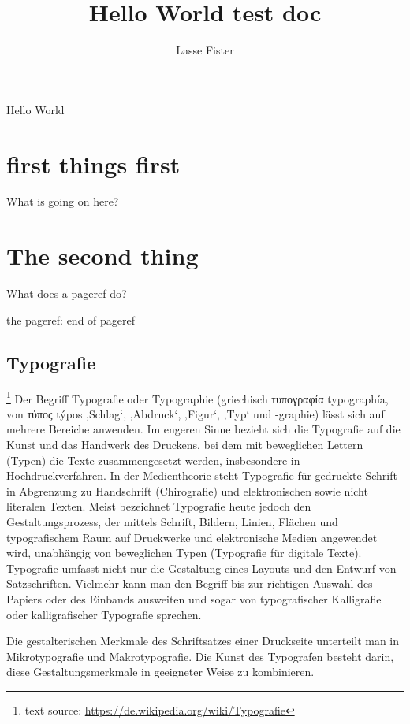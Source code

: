 \documentclass[a4paper]{article}
\title{Hello World test doc}
\author{Lasse Fister}
\begin{document}
\pagecolor{pagecolor}
\color{textcolor}

\maketitle
\tableofcontents
\newpage


Hello World

\section{first things first}

What is going on here?


\section{The second thing}
What does a pageref do?

the pageref: \pageref{ref:my-ref} end of pageref




\subsection{Typografie} \footnote{text source: \url{https://de.wikipedia.org/wiki/Typografie}}
\label{ref:my-ref}
Der Begriff Typografie oder Typographie (griechisch τυπογραφία typographía, von τύπος týpos ‚Schlag‘, ‚Abdruck‘, ‚Figur‘, ‚Typ‘ und -graphie) lässt sich auf mehrere Bereiche anwenden. Im engeren Sinne bezieht sich die Typografie auf die Kunst und das Handwerk des Druckens, bei dem mit beweglichen Lettern (Typen) die Texte zusammengesetzt werden, insbesondere in Hochdruckverfahren. In der Medientheorie steht Typografie für gedruckte Schrift in Abgrenzung zu Handschrift (Chirografie) und elektronischen sowie nicht literalen Texten. Meist bezeichnet Typografie heute jedoch den Gestaltungsprozess, der mittels Schrift, Bildern, Linien, Flächen und typografischem Raum auf Druckwerke und elektronische Medien angewendet wird, unabhängig von beweglichen Typen (Typografie für digitale Texte). Typografie umfasst nicht nur die Gestaltung eines Layouts und den Entwurf von Satzschriften. Vielmehr kann man den Begriff bis zur richtigen Auswahl des Papiers oder des Einbands ausweiten und sogar von typografischer Kalligrafie oder kalligrafischer Typografie sprechen.

Die gestalterischen Merkmale des Schriftsatzes einer Druckseite unterteilt man in Mikrotypografie und Makrotypografie. Die Kunst des Typografen besteht darin, diese Gestaltungsmerkmale in geeigneter Weise zu kombinieren.
\end{document}
